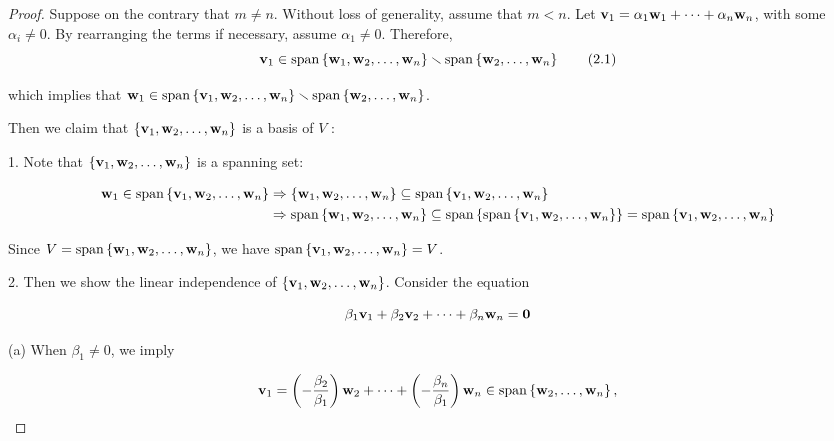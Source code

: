 \documentclass[11pt]{article}
\begin{document}
\begin{proof} Suppose on the contrary that \(m \neq  n\). Without loss of generality, assume that \(m < n\). Let \({\bf v}_1 = \alpha_1{\bf w}_1 + \cdots  + \alpha_n{\bf w}_n\), with some \(\alpha_{i} \neq  0\). By rearranging the terms if necessary, assume \(\alpha_1 \neq  0\). Therefore,
\[
{\bf v}_1 \in  \operatorname{span}\left\{  {{\bf w}_1,{\bf w}_2,\ldots ,{\bf w}_n}\right\}   \smallsetminus  \operatorname{span}\left\{  {{\bf w}_2,\ldots ,{\bf w}_n}\right\}   \tag{2.1}
\]

which implies that \({\bf w}_1 \in  \operatorname{span}\left\{  {{\bf v}_1,{\bf w}_2,\ldots ,{\bf w}_n}\right\}   \smallsetminus  \operatorname{span}\left\{  {{\bf w}_2,\ldots ,{\bf w}_n}\right\}\).

Then we claim that \(\left\{  {{\bf v}_1,{\bf w}_2,\ldots ,{\bf w}_n}\right\}\) is a basis of \(V\) :

1. Note that \(\left\{  {{\bf v}_1,{\bf w}_2,\ldots ,{\bf w}_n}\right\}\) is a spanning set:

\begin{align*}
{\bf w}_1 \in  \operatorname{span}\left\{  {{\bf v}_1,{\bf w}_2,\ldots ,{\bf w}_n}\right\}  &\Rightarrow  \left\{  {{\bf w}_1,{\bf w}_2,\ldots ,{\bf w}_n}\right\}   \subseteq  \operatorname{span}\left\{  {{\bf v}_1,{\bf w}_2,\ldots ,{\bf w}_n}\right\}
\\
&\Rightarrow  \operatorname{span}\left\{  {{\bf w}_1,{\bf w}_2,\ldots ,{\bf w}_n}\right\}   \subseteq  \operatorname{span}\left\{  {\operatorname{span}\left\{  {{\bf v}_1,{\bf w}_2,\ldots ,{\bf w}_n}\right\}  }\right\}   =\operatorname{span}\left\{  {{\bf v}_1,{\bf w}_2,\ldots ,{\bf w}_n}\right\}
\end{align*}

Since \(V = \operatorname{span}\left\{  {{\bf w}_1,{\bf w}_2,\ldots ,{\bf w}_n}\right\}\), we have \(\operatorname{span}\left\{  {{\bf v}_1,{\bf w}_2,\ldots ,{\bf w}_n}\right\}   = V\).

2. Then we show the linear independence of \(\left\{  {{\bf v}_1,{\bf w}_2,\ldots ,{\bf w}_n}\right\}\). Consider the equation

\[
\beta_1{\bf v}_1 + \beta_2{\bf v}_2 + \cdots  + \beta_n{\bf w}_n = \mathbf{0}
\]

(a) When \(\beta_1 \neq  0\), we imply

\[
{\bf v}_1 = \left( {-\frac{\beta_2}{\beta_1}}\right) {\bf w}_2 + \cdots  + \left( {-\frac{\beta_n}{\beta_1}}\right) {\bf w}_n \in  \operatorname{span}\left\{  {{\bf w}_2,\ldots ,{\bf w}_n}\right\}  ,
\]


\end{proof}
\end{document}
